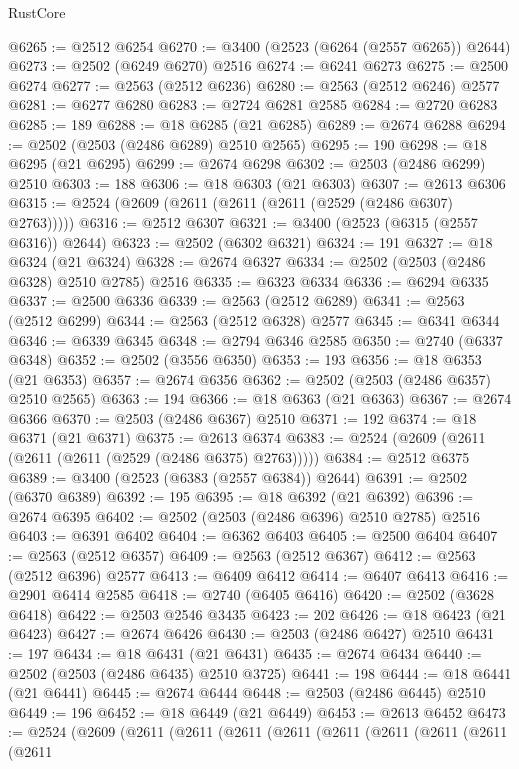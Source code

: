 \begin{lexlean}{RustCore}
\begin{coremodule}
@6265 := @2512 @6254
@6270 := @3400 (@2523 (@6264 (@2557 @6265)) @2644)
@6273 := @2502 (@6249 @6270) @2516
@6274 := @6241 @6273
@6275 := @2500 @6274
@6277 := @2563 (@2512 @6236)
@6280 := @2563 (@2512 @6246) @2577
@6281 := @6277 @6280
@6283 := @2724 @6281 @2585
@6284 := @2720 @6283
@6285 := 189
@6288 := @18 @6285 (@21 @6285)
@6289 := @2674 @6288
@6294 := @2502 (@2503 (@2486 @6289) @2510 @2565)
@6295 := 190
@6298 := @18 @6295 (@21 @6295)
@6299 := @2674 @6298
@6302 := @2503 (@2486 @6299) @2510
@6303 := 188
@6306 := @18 @6303 (@21 @6303)
@6307 := @2613 @6306
@6315 := @2524 (@2609 (@2611 (@2611 (@2611 (@2529 (@2486 @6307) @2763)))))
@6316 := @2512 @6307
@6321 := @3400 (@2523 (@6315 (@2557 @6316)) @2644)
@6323 := @2502 (@6302 @6321)
@6324 := 191
@6327 := @18 @6324 (@21 @6324)
@6328 := @2674 @6327
@6334 := @2502 (@2503 (@2486 @6328) @2510 @2785) @2516
@6335 := @6323 @6334
@6336 := @6294 @6335
@6337 := @2500 @6336
@6339 := @2563 (@2512 @6289)
@6341 := @2563 (@2512 @6299)
@6344 := @2563 (@2512 @6328) @2577
@6345 := @6341 @6344
@6346 := @6339 @6345
@6348 := @2794 @6346 @2585
@6350 := @2740 (@6337 @6348)
@6352 := @2502 (@3556 @6350)
@6353 := 193
@6356 := @18 @6353 (@21 @6353)
@6357 := @2674 @6356
@6362 := @2502 (@2503 (@2486 @6357) @2510 @2565)
@6363 := 194
@6366 := @18 @6363 (@21 @6363)
@6367 := @2674 @6366
@6370 := @2503 (@2486 @6367) @2510
@6371 := 192
@6374 := @18 @6371 (@21 @6371)
@6375 := @2613 @6374
@6383 := @2524 (@2609 (@2611 (@2611 (@2611 (@2529 (@2486 @6375) @2763)))))
@6384 := @2512 @6375
@6389 := @3400 (@2523 (@6383 (@2557 @6384)) @2644)
@6391 := @2502 (@6370 @6389)
@6392 := 195
@6395 := @18 @6392 (@21 @6392)
@6396 := @2674 @6395
@6402 := @2502 (@2503 (@2486 @6396) @2510 @2785) @2516
@6403 := @6391 @6402
@6404 := @6362 @6403
@6405 := @2500 @6404
@6407 := @2563 (@2512 @6357)
@6409 := @2563 (@2512 @6367)
@6412 := @2563 (@2512 @6396) @2577
@6413 := @6409 @6412
@6414 := @6407 @6413
@6416 := @2901 @6414 @2585
@6418 := @2740 (@6405 @6416)
@6420 := @2502 (@3628 @6418)
@6422 := @2503 @2546 @3435
@6423 := 202
@6426 := @18 @6423 (@21 @6423)
@6427 := @2674 @6426
@6430 := @2503 (@2486 @6427) @2510
@6431 := 197
@6434 := @18 @6431 (@21 @6431)
@6435 := @2674 @6434
@6440 := @2502 (@2503 (@2486 @6435) @2510 @3725)
@6441 := 198
@6444 := @18 @6441 (@21 @6441)
@6445 := @2674 @6444
@6448 := @2503 (@2486 @6445) @2510
@6449 := 196
@6452 := @18 @6449 (@21 @6449)
@6453 := @2613 @6452
@6473 := @2524
    (@2609
      (@2611
        (@2611
          (@2611
            (@2611
              (@2611
                (@2611
                  (@2611
                    (@2611
                      (@2611

\end{coremodule}
\end{lexlean}
